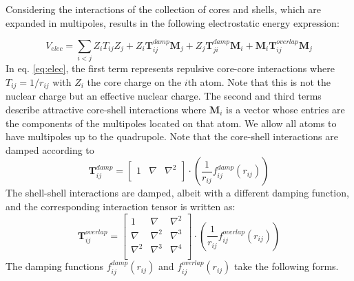 \documentclass[journal=jacsat,manuscript=article]{achemso}
\begin{document}
Considering the interactions of the collection of cores and shells, which are expanded in multipoles, results in the following electrostatic energy expression:

\begin{equation}
  V_{elec}=\sum_{i<j}Z_iT_{ij}Z_j+Z_i\bm{T}_{ij}^{damp}\bm{M}_j+Z_j\bm{T}_{ji}^{damp}\bm{M}_i+\bm{M}_i\bm{T}_{ij}^{overlap}\bm{M}_j
  \label{eq:elec}
\end{equation}
\noindent
In eq. \ref{eq:elec}, the first term represents repulsive core-core interactions where $T_{ij}=1/r_{ij}$ with $Z_i$ the core charge on the $i$th atom. Note that this is not the nuclear charge but an effective nuclear charge. The second and third terms describe attractive core-shell interactions where $\bm{M}_i$ is a vector whose entries are the components of the multipoles located on that atom. We allow all atoms to have multipoles up to the quadrupole. Note that the core-shell interactions are damped according to
\begin{equation}
  \bm{T}_{ij}^{damp}=
  \begin{bmatrix}
    1 & \nabla & \nabla^2 \\
  \end{bmatrix}\cdot
  \left(\frac{1}{r_{ij}}f_{ij}^{damp}(r_{ij})\right)
  \label{eq:T_damp}
\end{equation}
\noindent
The shell-shell interactions are damped, albeit with a different damping function, and the corresponding interaction tensor is written as:
\begin{equation}
  \bm{T}_{ij}^{overlap}=
  \begin{bmatrix}
    1 & \nabla & \nabla^2 \\
    \nabla & \nabla^2 & \nabla^3 \\
    \nabla^2 & \nabla^3 & \nabla^4 \\
  \end{bmatrix}\cdot
  \left(\frac{1}{r_{ij}}f_{ij}^{overlap}(r_{ij})\right)
  \label{eq:T_overlap}
\end{equation}
\noindent
The damping functions $f_{ij}^{damp}(r_{ij})$ and $f_{ij}^{overlap}(r_{ij})$  take the following forms.
\end{document}
